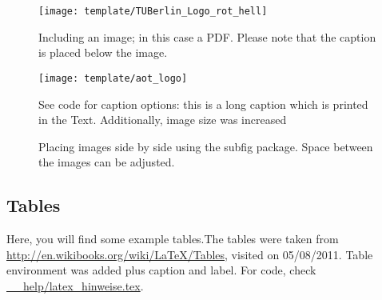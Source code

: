 \begin{figure}[h]%
\centering
\texttt{[image: template/TUBerlin\_Logo\_rot\_hell]}
\caption[Including an Image]{Including an image; in this case a PDF. Please note that the caption is placed below the image.\label{fig:help1}}
\end{figure}

\begin{figure}[h]
\centering
\texttt{[image: template/aot\_logo]}
\caption[Short caption for list of figures]{See code for caption options: this is a long caption which is printed in the Text. Additionally, image size was increased\label{fig:help2}}
\end{figure}


\begin{figure}[h]
  \centering
  \caption[Placing images side by side]{Placing images side by side using the subfig package. Space between the images can be adjusted.\label{fig:tuball}}
\end{figure}


\newpage
\subsection*{Tables}
Here, you will find some example tables.The tables were taken from \url{http://en.wikibooks.org/wiki/LaTeX/Tables}, visited on 05/08/2011. Table environment was added plus caption and label. For code, check \url{__help/latex_hinweise.tex}.

